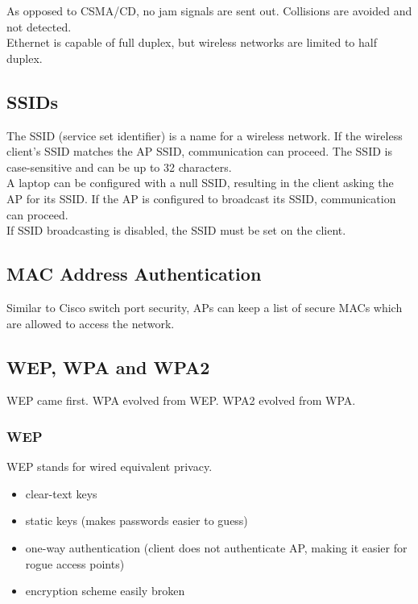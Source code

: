 As opposed to CSMA/CD, no jam signals are sent out. Collisions are avoided
and not detected.\\

Ethernet is capable of full duplex, but wireless networks are limited to half
duplex.

\subsection{SSIDs}

The SSID (service set identifier) is a name for a wireless network. If the
wireless client's SSID matches the AP SSID, communication can proceed. The SSID
is case-sensitive and can be up to 32 characters.\\

A laptop can be configured with a null SSID, resulting in the client asking
the AP for its SSID. If the AP is configured to broadcast its SSID,
communication can proceed.\\

If SSID broadcasting is disabled, the SSID must be set on the client.

\subsection{MAC Address Authentication}

Similar to Cisco switch port security, APs can keep a list of secure MACs
which are allowed to access the network.

\subsection{WEP, WPA and WPA2}

WEP came first. WPA evolved from WEP. WPA2 evolved from WPA.

\subsubsection{WEP}

WEP stands for wired equivalent privacy.

\begin{itemize}

\item clear-text keys
\item static keys (makes passwords easier to guess)
\item one-way authentication (client does not authenticate AP, making it easier
for rogue access points)
\item encryption scheme easily broken

\end{itemize}

